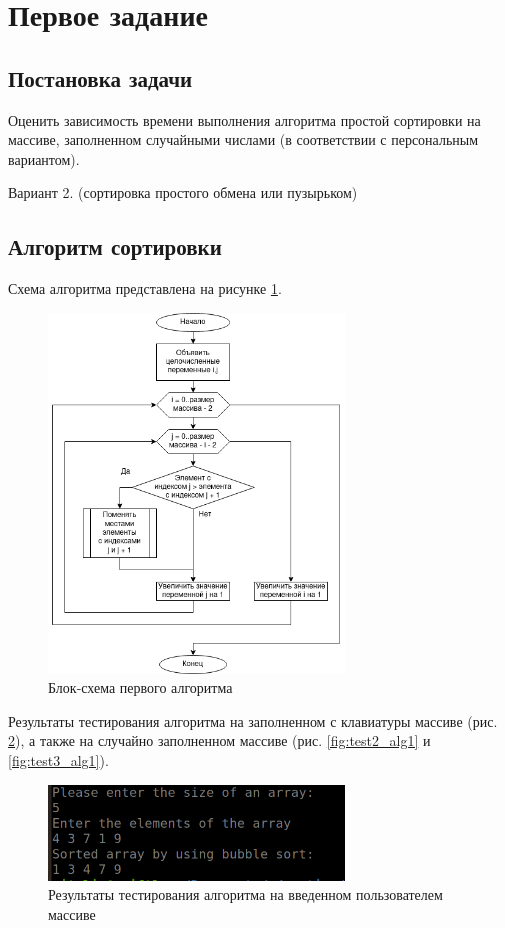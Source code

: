\documentclass[14pt]{extarticle}
\begin{document}

\newpage
\tableofcontents
\newpage
\section{Первое задание}
\subsection{Постановка задачи}
Оценить зависимость времени выполнения алгоритма простой
сортировки на массиве, заполненном случайными числами (в соответствии с
персональным вариантом).

Вариант 2. (сортировка простого обмена или пузырьком)
\subsection{Алгоритм сортировки}
Схема алгоритма представлена на рисунке \ref{fig:first_alg_scheme}.

\begin{figure}[htpb]
  \centering
  \includegraphics[width=0.7\textwidth]{pictures/first_task.png}
  \caption{Блок-схема первого алгоритма}
  \label{fig:first_alg_scheme}
\end{figure}
\newpage

Результаты тестирования алгоритма на заполненном с клавиатуры массиве
(рис. \ref{fig:test1_alg1}), а также на случайно заполненном массиве
(рис. \ref{fig:test2_alg1} и \ref{fig:test3_alg1}).

\begin{figure}[htpb]
  \centering
  \includegraphics[width=0.7\textwidth]{pictures/test1_alg1.png}
  \caption{Результаты тестирования алгоритма на введенном пользователем массиве}
  \label{fig:test1_alg1}
\end{figure}
\end{document}
